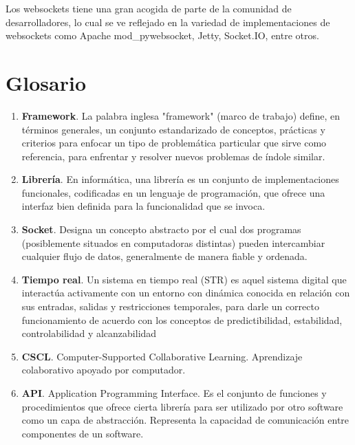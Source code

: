 Los websockets tiene una gran acogida de parte de la comunidad de desarrolladores, lo cual se ve reflejado en la variedad de implementaciones de websockets como Apache mod\_pywebsocket, Jetty, Socket.IO, entre otros.


\section{Glosario}

\begin{enumerate}
  \item \textbf{Framework}. La palabra inglesa "framework" (marco de trabajo) define, en términos generales, un conjunto estandarizado de conceptos, prácticas y criterios para enfocar un tipo de problemática particular que sirve como referencia, para enfrentar y resolver nuevos problemas de índole similar.
  \item \textbf{Librería}. En informática, una librería es un conjunto de implementaciones funcionales, codificadas en un lenguaje de programación, que ofrece una interfaz bien definida para la funcionalidad que se invoca.
  \item \textbf{Socket}. Designa un concepto abstracto por el cual dos programas (posiblemente situados en computadoras distintas) pueden intercambiar cualquier flujo de datos, generalmente de manera fiable y ordenada.
  \item \textbf{Tiempo real}. Un sistema en tiempo real (STR) es aquel sistema digital que interactúa activamente con un entorno con dinámica conocida en relación con sus entradas, salidas y restricciones temporales, para darle un correcto funcionamiento de acuerdo con los conceptos de predictibilidad, estabilidad, controlabilidad y alcanzabilidad
  \item \textbf{CSCL}. Computer-Supported Collaborative Learning. Aprendizaje colaborativo apoyado por computador.
  \item \textbf{API}. Application Programming Interface. Es el conjunto de funciones y procedimientos que ofrece cierta librería para ser utilizado por otro software como un capa de abstracción. Representa la capacidad de comunicación entre componentes de un software.
\end{enumerate}














